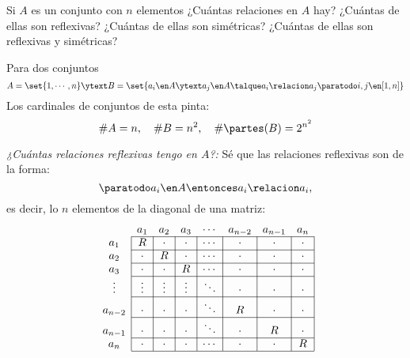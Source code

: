 \begin{enunciado}{\ejercicio}
  Si $A$ es un conjunto con $n$ elementos ¿Cuántas relaciones en $A$ hay?
  ¿Cuántas de ellas son reflexivas?
  ¿Cuántas de  ellas son simétricas? ¿Cuántas de ellas son reflexivas y simétricas? \\
\end{enunciado}

Para dos conjuntos
$$
  A = \set{1,\cdots, n}
  \ytext
  B = \set{ a_i \en A \ytext a_j \en A \talque  a_i \relacion a_j \paratodo i,j \en [1, n] }
$$
Los cardinales de conjuntos de esta pinta:
$$
  \#A = n
  ,\quad
  \#B = n^2
  ,\quad
  \#\partes(B) = 2^{n^2}
$$

\bigskip

\textit{¿Cuántas relaciones reflexivas tengo en $A$?:}
Sé que las relaciones reflexivas son de la forma:
$$
  \paratodo a_i \en A \entonces a_i \relacion a_i,
$$
es decir, lo $n$ elementos de la diagonal de una matriz:
$$
  \begin{array}{c|c|c|c|c|c|c|c|}
    \multicolumn{1}{c}{} & \multicolumn{1}{c}{a_1} & \multicolumn{1}{c}{a_2} & \multicolumn{1}{c}{a_3} & \multicolumn{1}{c}{\cdots} & \multicolumn{1}{c}{a_{n-2}} & \multicolumn{1}{c}{a_{n-1}} & \multicolumn{1}{c}{a_n} \\ \cline{2-8}
    a_1                  & R                       & \cdot                   & \cdot                   & \cdots                     & \cdot                       & \cdot                       & \cdot                   \\ \cline{2-8}
    a_2                  & \cdot                   & R                       & \cdot                   & \cdots                     & \cdot                       & \cdot                       & \cdot                   \\ \cline{2-8}
    a_3                  & \cdot                   & \cdot                   & R                       & \cdots                     & \cdot                       & \cdot                       & \cdot                   \\ \cline{2-8}
    \vdots               & \vdots                  & \vdots                  & \vdots                  & \ddots                     & \cdot                       & \cdot                       & \cdot                   \\ \cline{2-8}
    a_{n-2}              & \cdot                   & \cdot                   & \cdot                   & \ddots                     & R                           & \cdot                       & \cdot                   \\ \cline{2-8}
    a_{n-1}              & \cdot                   & \cdot                   & \cdot                   & \ddots                     & \cdot                       & R                           & \cdot                   \\ \cline{2-8}
    a_n                  & \cdot                   & \cdot                   & \cdot                   & \cdots                     & \cdot                       & \cdot                       & R                       \\ \cline{2-8}
  \end{array}
$$
